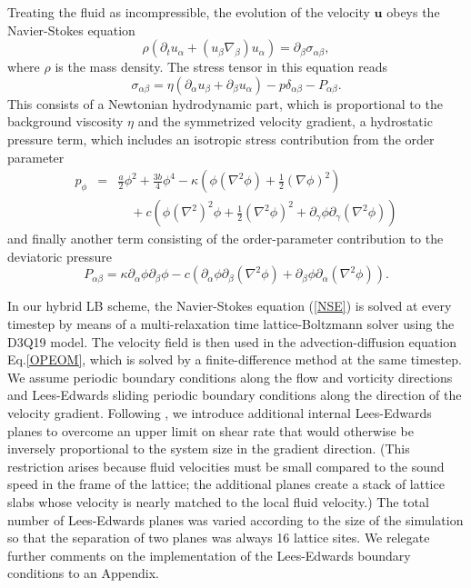 \documentclass[8.5pt,twoside,twocolumn]{article}
\begin{document}
Treating the fluid as incompressible, the evolution of the velocity ${\bm u}$ obeys the Navier-Stokes equation
%
\begin{equation}\label{NSE}
\rho(\partial_t u_\alpha + (u_\beta \nabla_\beta) u_\alpha) = \partial_\beta \sigma_{\alpha \beta},
\end{equation}
%
where $\rho$ is the mass density. The stress tensor in this equation reads
%
\begin{equation}
\sigma_{\alpha \beta}=\eta (\partial_\alpha u_\beta + \partial_\beta u_\alpha)-p\delta_{\alpha\beta} - P_{\alpha \beta}. \label{fullstress}
\end{equation}
%
This consists of a Newtonian hydrodynamic part, which is proportional to the background viscosity $\eta$ and the symmetrized velocity gradient, a hydrostatic pressure term, which includes an isotropic stress contribution from the order parameter 
%
\begin{eqnarray}
p_{\phi}&=& \frac{a}{2}\phi^2+\frac{3b}{4}\phi^4-\kappa\left(\phi(\nabla^2\phi)+\frac{1}{2}({\nabla}\phi)^2\right)\nonumber\\
& &\quad+c\left(\phi(\nabla^2)^2\phi+\frac{1}{2}(\nabla^2\phi)^2+\partial_{\gamma}\phi\partial_\gamma(\nabla^2\phi)\right)
\end{eqnarray}
%
and finally another term consisting of the order-parameter contribution to the deviatoric pressure~\cite{Swift96,Yang76,Evans79} 
%
\begin{equation}
P_{\alpha \beta}=\kappa\partial_\alpha\phi\partial_\beta\phi -c \left(\partial_\alpha\phi\partial_\beta(\nabla^2\phi)+\partial_\beta\phi\partial_\alpha(\nabla^2\phi)\right).
\end{equation}

In our hybrid LB scheme, the Navier-Stokes equation (\ref{NSE}) is solved at every timestep by means of a multi-relaxation time lattice-Boltzmann solver \cite{dHumieres02,Adhikari05} using the D3Q19 model.
The velocity field is then used in the advection-diffusion equation Eq.\ref{OPEOM}, which is solved by a finite-difference method at the same timestep. We assume periodic boundary conditions along the flow and vorticity directions and Lees-Edwards sliding periodic boundary conditions\cite{leesedwards,Wagner02} along the direction of the velocity gradient.
Following \cite{Wagner02}, we introduce
additional internal Lees-Edwards planes to overcome an upper limit on shear rate that would otherwise be inversely proportional to the system size in the gradient direction. (This restriction arises because fluid velocities must be small compared to the sound speed in the frame of the lattice; the additional planes create a stack of lattice slabs whose velocity is nearly matched to the local fluid velocity.) 
The total number of Lees-Edwards planes was varied according to the size of the simulation so that the separation of two planes was always 16 lattice sites.
We relegate further comments on the implementation of the Lees-Edwards boundary
conditions to an Appendix. 
\end{document}
